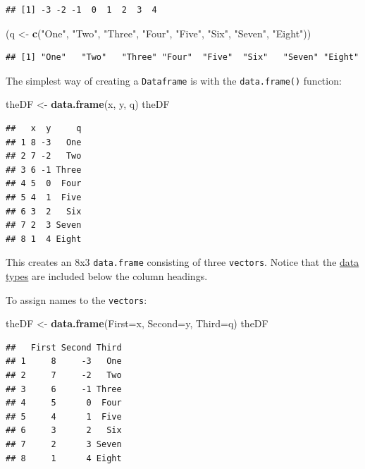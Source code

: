 \documentclass[]{book}
\newenvironment{Shaded}{\begin{snugshade}}{\end{snugshade}}
\newcommand{\DataTypeTok}[1]{\textcolor[rgb]{0.13,0.29,0.53}{#1}}
\newcommand{\KeywordTok}[1]{\textcolor[rgb]{0.13,0.29,0.53}{\textbf{#1}}}
\newcommand{\NormalTok}[1]{#1}
\newcommand{\StringTok}[1]{\textcolor[rgb]{0.31,0.60,0.02}{#1}}
\theoremstyle{definition}
\theoremstyle{definition}
\theoremstyle{definition}
\theoremstyle{remark}
\begin{document}
\begin{verbatim}
## [1] -3 -2 -1  0  1  2  3  4
\end{verbatim}

\begin{Shaded}
\begin{Highlighting}[]
\NormalTok{(q <-}\StringTok{ }\KeywordTok{c}\NormalTok{(}\StringTok{"One"}\NormalTok{, }\StringTok{"Two"}\NormalTok{, }\StringTok{"Three"}\NormalTok{, }\StringTok{"Four"}\NormalTok{, }\StringTok{"Five"}\NormalTok{, }\StringTok{"Six"}\NormalTok{, }\StringTok{"Seven"}\NormalTok{, }\StringTok{"Eight"}\NormalTok{))}
\end{Highlighting}
\end{Shaded}

\begin{verbatim}
## [1] "One"   "Two"   "Three" "Four"  "Five"  "Six"   "Seven" "Eight"
\end{verbatim}

The simplest way of creating a \texttt{Dataframe} is with the
\texttt{data.frame()} function:

\begin{Shaded}
\begin{Highlighting}[]
\NormalTok{theDF <-}\StringTok{ }\KeywordTok{data.frame}\NormalTok{(x, y, q)}
\NormalTok{theDF}
\end{Highlighting}
\end{Shaded}

\begin{verbatim}
##   x  y     q
## 1 8 -3   One
## 2 7 -2   Two
## 3 6 -1 Three
## 4 5  0  Four
## 5 4  1  Five
## 6 3  2   Six
## 7 2  3 Seven
## 8 1  4 Eight
\end{verbatim}

This creates an 8x3 \texttt{data.frame} consisting of three
\texttt{vectors}. Notice that the \protect\hyperlink{data-types}{data
types} are included below the column headings.

To assign names to the \texttt{vectors}:

\begin{Shaded}
\begin{Highlighting}[]
\NormalTok{theDF <-}\StringTok{ }\KeywordTok{data.frame}\NormalTok{(}\DataTypeTok{First=}\NormalTok{x, }\DataTypeTok{Second=}\NormalTok{y, }\DataTypeTok{Third=}\NormalTok{q)}
\NormalTok{theDF}
\end{Highlighting}
\end{Shaded}

\begin{verbatim}
##   First Second Third
## 1     8     -3   One
## 2     7     -2   Two
## 3     6     -1 Three
## 4     5      0  Four
## 5     4      1  Five
## 6     3      2   Six
## 7     2      3 Seven
## 8     1      4 Eight
\end{verbatim}
\end{document}
